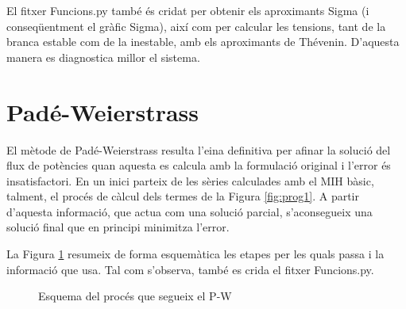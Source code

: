 El fitxer Funcions.py també és cridat per obtenir els aproximants Sigma (i conseqüentment el gràfic Sigma), així com per calcular les tensions, tant de la branca estable com de la inestable, amb els aproximants de Thévenin. D'aquesta manera es diagnostica millor el sistema.

\section{Padé-Weierstrass}
El mètode de Padé-Weierstrass resulta l'eina definitiva per afinar la solució del flux de potències quan aquesta es calcula amb la formulació original i l'error és insatisfactori. En un inici parteix de les sèries calculades amb el MIH bàsic, talment, el procés de càlcul dels termes de la Figura \ref{fig:prog1}. A partir d'aquesta informació, que actua com una solució parcial, s'aconsegueix una solució final que en principi minimitza l'error. 

La Figura \ref{fig:prog3} resumeix de forma esquemàtica les etapes per les quals passa i la informació que usa. Tal com s'observa, també es crida el fitxer Funcions.py.

\begin{figure}[!htb] \footnotesize
  \begin{center}
\caption{Esquema del procés que segueix el P-W}
\label{fig:prog3}
\end{center}
\end{figure}

